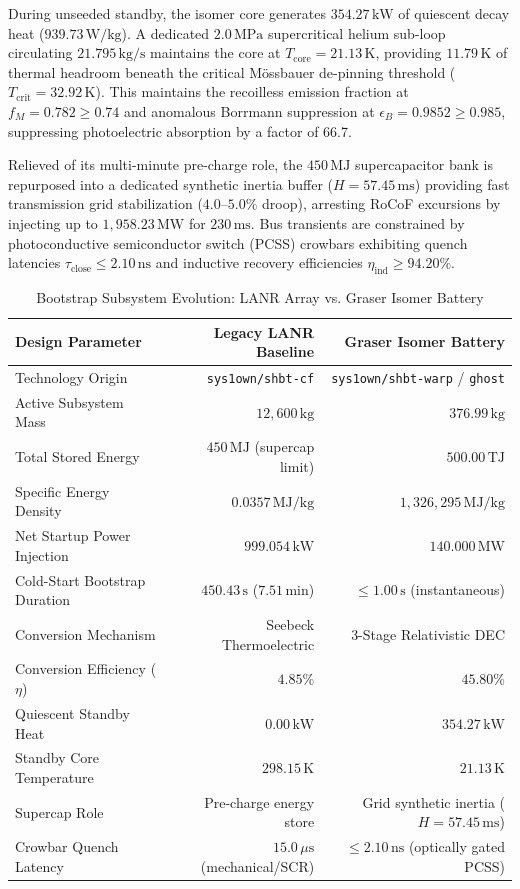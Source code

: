 \documentclass[11pt,journal,compsoc]{IEEEtran}
\begin{document}
During unseeded standby, the isomer core generates $354.27\,\text{kW}$ of quiescent decay heat ($939.73\,\text{W/kg}$). A dedicated $2.0\,\text{MPa}$ supercritical helium sub-loop circulating $21.795\,\text{kg/s}$ maintains the core at $T_{\text{core}} = 21.13\,\text{K}$, providing $11.79\,\text{K}$ of thermal headroom beneath the critical Mössbauer de-pinning threshold ($T_{\text{crit}} = 32.92\,\text{K}$). This maintains the recoilless emission fraction at $f_M = 0.782 \ge 0.74$ and anomalous Borrmann suppression at $\epsilon_B = 0.9852 \ge 0.985$, suppressing photoelectric absorption by a factor of 66.7.

Relieved of its multi-minute pre-charge role, the $450\,\text{MJ}$ supercapacitor bank is repurposed into a dedicated synthetic inertia buffer ($H = 57.45\,\text{ms}$) providing fast transmission grid stabilization ($4.0\text{--}5.0\%$ droop), arresting RoCoF excursions by injecting up to $1,958.23\,\text{MW}$ for $230\,\text{ms}$. Bus transients are constrained by photoconductive semiconductor switch (PCSS) crowbars exhibiting quench latencies $\tau_{\text{close}} \le 2.10\,\text{ns}$ and inductive recovery efficiencies $\eta_{\text{ind}} \ge 94.20\%$.

\begin{table}[htbp]
\centering
\small
\caption{Bootstrap Subsystem Evolution: LANR Array vs. Graser Isomer Battery}
\label{tab:bootstrap_comparison}
\begin{tabular}{lrr}
\hline
\textbf{Design Parameter} & \textbf{Legacy LANR Baseline} & \textbf{Graser Isomer Battery} \\
\hline
Technology Origin & \texttt{sys1own/shbt-cf} & \texttt{sys1own/shbt-warp} / \texttt{ghost} \\
Active Subsystem Mass & $12,600\,\text{kg}$ & $376.99\,\text{kg}$ \\
Total Stored Energy & $450\,\text{MJ}$ (supercap limit) & $500.00\,\text{TJ}$ \\
Specific Energy Density & $0.0357\,\text{MJ/kg}$ & $1,326,295\,\text{MJ/kg}$ \\
Net Startup Power Injection & $999.054\,\text{kW}$ & $140.000\,\text{MW}$ \\
Cold-Start Bootstrap Duration & $450.43\,\text{s}$ ($7.51\,\text{min}$) & $\le 1.00\,\text{s}$ (instantaneous) \\
Conversion Mechanism & Seebeck Thermoelectric & 3-Stage Relativistic DEC \\
Conversion Efficiency ($\eta$) & $4.85\%$ & $45.80\%$ \\
Quiescent Standby Heat & $0.00\,\text{kW}$ & $354.27\,\text{kW}$ \\
Standby Core Temperature & $298.15\,\text{K}$ & $21.13\,\text{K}$ \\
Supercap Role & Pre-charge energy store & Grid synthetic inertia ($H=57.45\,\text{ms}$) \\
Crowbar Quench Latency & $15.0\,\mu\text{s}$ (mechanical/SCR) & $\le 2.10\,\text{ns}$ (optically gated PCSS) \\
\hline
\end{tabular}
\end{table}
\end{document}

